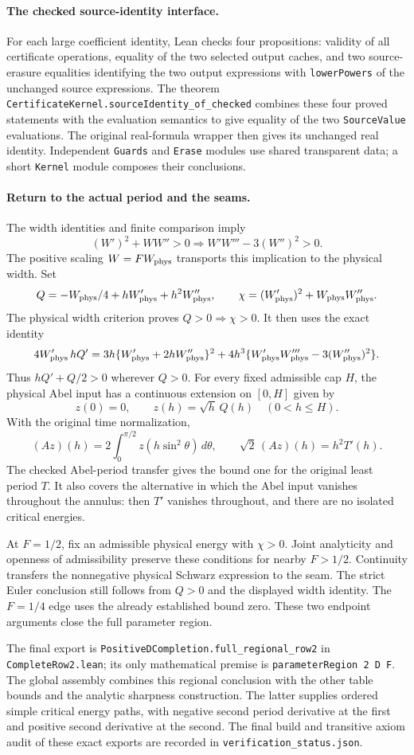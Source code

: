 \paragraph{The checked source-identity interface.}
For each large coefficient identity, Lean checks four propositions:
validity of all certificate operations, equality of the two selected
output caches, and two source-erasure equalities identifying the two
output expressions with \texttt{lowerPowers} of the unchanged source expressions.
The theorem \texttt{CertificateKernel.sourceIdentity\_of\_checked} combines
these four proved statements with the evaluation semantics to give equality
of the two \texttt{SourceValue} evaluations. The original real-formula
wrapper then gives its unchanged real identity. Independent \texttt{Guards}
and \texttt{Erase} modules use shared transparent data; a short
\texttt{Kernel} module composes their conclusions.

\paragraph{Return to the actual period and the seams.}
The width identities and finite comparison imply
\[
 (W')^2+WW''>0\Longrightarrow W'W'''-3(W'')^2>0.
\]
The positive scaling $W=F W_{\rm phys}$ transports this implication
to the physical width. Set
\[
 Q=-W_{\rm phys}/4+hW_{\rm phys}'+h^2W_{\rm phys}'',\qquad
 \chi=(W_{\rm phys}')^2+W_{\rm phys}W_{\rm phys}''.
\]
The physical width criterion proves $Q>0\Longrightarrow\chi>0$.
It then uses the exact identity
\[
 4W_{\rm phys}'\,hQ'
 =3h\{W_{\rm phys}'+2hW_{\rm phys}''\}^2
  +4h^3\{W_{\rm phys}'W_{\rm phys}'''-3(W_{\rm phys}'')^2\}.
\]
Thus $hQ'+Q/2>0$ wherever $Q>0$.
For every fixed admissible cap $H$, the physical Abel input has a
continuous extension on $[0,H]$ given by
\[
 z(0)=0,\qquad z(h)=\sqrt h\,Q(h)\quad(0<h\le H).
\]
With the original time normalization,
\[
 (Az)(h)=2\int_0^{\pi/2}z(h\sin^2\theta)\,d\theta,\qquad
 \sqrt2\,(Az)(h)=h^2T'(h).
\]
The checked Abel-period transfer gives the bound one for the original
least period $T$. It also covers the alternative in which the Abel
input vanishes throughout the annulus: then $T'$ vanishes throughout,
and there are no isolated critical energies.

At $F=1/2$, fix an admissible physical energy with $\chi>0$.
Joint analyticity and openness of admissibility preserve these
conditions for nearby $F>1/2$. Continuity transfers the nonnegative
physical Schwarz expression to the seam. The strict Euler conclusion
still follows from $Q>0$ and the displayed width identity.
The $F=1/4$ edge uses the already established bound zero.
These two endpoint arguments close the full parameter region.

The final export is
\texttt{PositiveDCompletion.full\_regional\_row2} in
\texttt{CompleteRow2.lean}; its only mathematical premise is
\texttt{parameterRegion 2 D F}. The global assembly combines this
regional conclusion with the other table bounds and the analytic
sharpness construction. The latter supplies ordered simple critical
energy paths, with negative second period derivative at the first
and positive second derivative at the second. The final build and transitive
axiom audit of these exact exports are recorded in
\texttt{verification\_status.json}.
